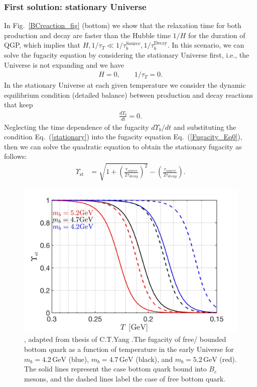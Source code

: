 \subsubsection{First solution: stationary Universe}
In Fig.~\ref{BCreaction_fig} (bottom) we show that the relaxation time for both production and decay are faster than the Hubble time $1/H$ for the duration of QGP, which implies that $H,1/\tau_T\ll1/\tau_{b}^{\mathrm{Source}},1/\tau^{\mathrm{Decay}}_b$. In this scenario, we can solve the fugacity equation by considering the stationary Universe first, i.e., the Universe is not expanding and we have
\begin{align}\label{stationary}
H=0,\qquad1/\tau_T=0.
\end{align} 
In the stationary Universe at each given temperature we consider the dynamic equilibrium condition (detailed balance) between production and decay reactions that keep
\begin{align}
\frac{d\Upsilon_b}{dt}=0.
\end{align}
Neglecting the time dependence of the fugacity $d\Upsilon_b/dt$ and substituting the condition Eq.~(\ref{stationary}) into the fugacity equation Eq.~(\ref{Fugacity_Eq0}), then we can solve the quadratic equation to obtain the stationary fugacity as follows: 
\begin{align}
\label{Fugacity_Sol}
\Upsilon_{\mathrm{st}}&=\sqrt{1+\left(\frac{\tau_{source}}{2\tau_{decay}}\right)^2}-\left(\frac{\tau_{source}}{2\tau_{decay}}\right).
\end{align}
\begin{figure}[ht]
\begin{center}
\includegraphics[width=\textwidth]{./plots/BquarkFugacity_tot}
\caption{, adapted from thesis of C.T.Yang \cite{Yang:2024ret}.The fugacity of free/ bounded bottom quark as a function of temperature in the early Universe for $m_b=4.2\,\mathrm{GeV}$ (blue), $m_b=4.7\,\mathrm{GeV}$ (black), and $m_b=5.2\,\mathrm{GeV}$ (red). The solid lines represent the case bottom quark bound into $B_c$ mesons, and the dashed lines label the case of  free bottom quark.}
\label{fugacity_bc}
\end{center}
\end{figure}
